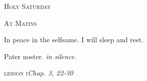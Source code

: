 ﻿%
\vspace*{-50pt plus 20pt}
\begin{center}{%
\huge \textsc{Holy Saturday}

\bigskip
\normalsize\textsc{At Matins}
}\end{center}


\def\officehour{Matins}
\def\matinsnocturn{1st Nocturn}
%
\large
\def\preant{\setgrefactor{17}\large}
\def\prepsalm{\normalsize\greblockcustos}
\def\anttranslation{In peace in the selfsame, I will sleep and rest.}
\def\psalmtranslationsmall{T}
\let\prepsalm=\undefined
%
\def\preant{\setgrefactor{17}\large}
\def\prepsalm{\normalsize\greblockcustos}
\def\psalmtranslationsmall{T}
\def\anttranslation{He shall dwell in Thy tabernacle, He shall rest on Thy holy hill.}
\let\prepsalm=\undefined
\bigskip
%
\def\preant{\setgrefactor{17}\large}
\def\psalmtranslationsmall{T}
\def\anttranslation{My flesh shall rest in hope.}
\def\prepsalm{\normalsize}
\let\prepsalm=\undefined

\bigskip
{}
{In peace in the selfsame.}
{I will sleep and rest.}

\bigskip
Pater noster. \emph{in silence.}

\medskip
\hspace{10ex}\textsc{lesson i}\hfill\emph{Chap. 3, 22-30}\hspace{10ex}

